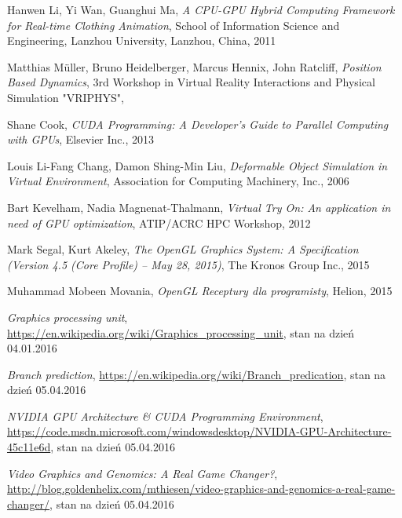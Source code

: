 \begin{thebibliography}{999}

 Hanwen Li, Yi Wan, Guanghui Ma, \emph{A CPU-GPU Hybrid Computing Framework for Real-time Clothing Animation}, School of Information Science and Engineering, Lanzhou University, Lanzhou, China, 2011

 Matthias Müller, Bruno Heidelberger, Marcus Hennix, John Ratcliff, \emph{Position Based Dynamics}, 3rd Workshop in Virtual Reality Interactions and Physical Simulation "VRIPHYS", 

 Shane Cook, \emph{CUDA Programming: A Developer's Guide to Parallel Computing with GPUs}, Elsevier Inc., 2013

 Louis Li-Fang Chang, Damon Shing-Min Liu, \emph{Deformable Object Simulation in Virtual Environment}, Association for Computing Machinery, Inc., 2006

 Bart Kevelham, Nadia Magnenat-Thalmann, \emph{Virtual Try On: An application in need of GPU optimization}, ATIP/A\*CRC HPC Workshop, 2012

 Mark Segal, Kurt Akeley, \emph{The OpenGL Graphics System: A Specification (Version 4.5 (Core Profile) -- May 28, 2015)}, The Kronos Group Inc., 2015

 Muhammad Mobeen Movania, \emph{OpenGL Receptury dla programisty}, Helion, 2015

 \emph{Graphics processing unit}, \href{https://en.wikipedia.org/wiki/Graphics\_processing\_unit}{https://en.wikipedia.org/wiki/Graphics\_processing\_unit}, stan na dzień 04.01.2016

 \emph{Branch prediction}, \href{https://en.wikipedia.org/wiki/Branch\_predication}{https://en.wikipedia.org/wiki/Branch\_predication}, stan na dzień 05.04.2016

 \emph{NVIDIA GPU Architecture \& CUDA Programming Environment}, \linebreak \href{https://code.msdn.microsoft.com/windowsdesktop/NVIDIA-GPU-Architecture-45c11e6d}{https://code.msdn.microsoft.com/windowsdesktop/NVIDIA-GPU-Architecture-45c11e6d}, stan na dzień 05.04.2016

 \emph{Video Graphics and Genomics: A Real Game Changer?}, \linebreak \href{http://blog.goldenhelix.com/mthiesen/video-graphics-and-genomics-a-real-game-changer/}{http://blog.goldenhelix.com/mthiesen/video-graphics-and-genomics-a-real-game-changer/}, stan na dzień 05.04.2016


\end{thebibliography}
